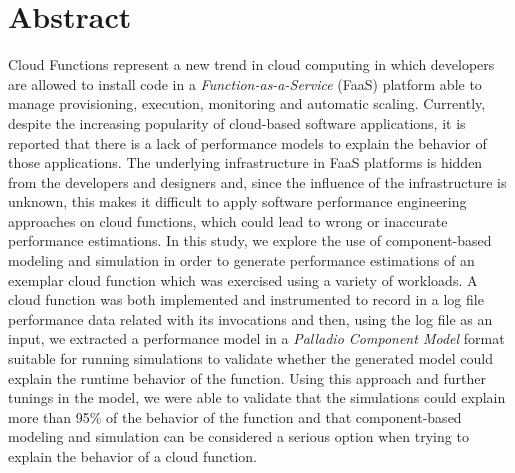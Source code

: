\section*{Abstract}
Cloud Functions represent a new trend in cloud computing in which developers are allowed to install code in a \emph{Function-as-a-Service} (FaaS) platform able to manage provisioning, execution, monitoring and automatic scaling. Currently, despite the increasing popularity of cloud-based software applications, it is reported that there is a lack of performance models to explain the behavior of those applications. The underlying infrastructure in FaaS platforms is hidden from the developers and designers and, since the influence of the infrastructure is unknown, this makes it difficult to apply software performance engineering approaches on cloud functions, which could lead to wrong or inaccurate performance estimations. In this study, we explore the use of component-based modeling and simulation in order to generate performance estimations of an exemplar cloud function which was exercised using a variety of workloads. A cloud function was both implemented and instrumented to record in a log file performance data related with its invocations and then, using the log file as an input, we extracted a performance model in a \emph{Palladio Component Model} format suitable for running simulations to validate whether the generated model could explain the runtime behavior of the function. Using this approach and further tunings in the model, we were able to validate that the simulations could explain more than 95\% of the behavior of the function and that component-based modeling and simulation can be considered a serious option when trying to explain the behavior of a cloud function.

\newpage